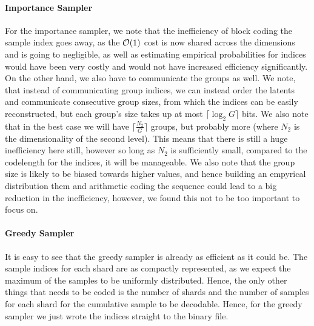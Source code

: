 \paragraph{Importance Sampler}  For the importance sampler, we note that the
inefficiency of block coding the sample index goes away, as the $\mathcal{O}(1)$ cost is
now shared across the dimensions and is going to negligible, as well as
estimating empirical probabilities for indices would have been very costly and
would not have increased efficiency significantly. On the other hand, we also
have to communicate the groups as well. We note, that instead of communicating
group indices, we can instead order the latents and communicate consecutive
group sizes, from which the indices can be easily reconstructed, but each
group's size takes up at most $\lceil \log_2G \rceil$ bits. We also note that in
the best case we will have $\lceil \frac{N_2}{G} \rceil$ groups, but probably
more (where $N_2$ is the dimensionality of the second level). This means that
there is still a huge inefficiency here still, however so long as $N_2$ is
sufficiently small, compared to the codelength for the indices, it will be
manageable. We also note that the group size is likely to be biased towards
higher values, and hence building an empyrical distribution them and arithmetic
coding the sequence could lead to a big reduction in the inefficiency, however,
we found this not to be too important to focus on. 
\paragraph{Greedy Sampler} It is easy to see that the greedy sampler is already
as efficient as it could be. The sample indices for each shard are as compactly
represented, as we expect the maximum of the samples to be uniformly
distributed. Hence, the only other things that needs to be coded is the number
of shards and the number of samples for each shard for the cumulative sample to
be decodable. Hence, for the greedy sampler we just wrote the indices straight
to the binary file.
